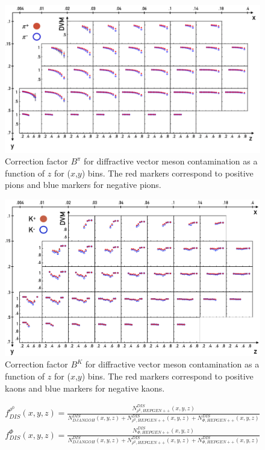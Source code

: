 \begin{figure}
	\includegraphics[scale=0.5]{./gfx/DVMpi.png}
	\caption{Correction factor $B^{\pi}$ for diffractive vector meson contamination as a function of $z$ for ($x$,$y$) bins. The red markers correspond to positive pions and blue markers for negative pions.}
	\label{DVMpi}
\end{figure}

\begin{figure}
	\includegraphics[scale=0.5]{./gfx/DVMK.png}
	\caption{Correction factor $B^{K}$ for diffractive vector meson contamination as a function of $z$ for ($x$,$y$) bins. The red markers correspond to positive kaons and blue markers for negative kaons.}
	\label{DVMK}
\end{figure}

\begin{equation}
  \begin{split}
    f^{\rho^0}_{DIS}(x,y,z) = \frac{N^{DIS}_{\rho^0,HEPGEN++}(x,y,z)}{N^{DIS}_{DJANGOH}(x,y,z)+N^{DIS}_{\rho^0,HEPGEN++}(x,y,z)+N^{DIS}_{\Phi,HEPGEN++}(x,y,z)} \\
    f^{\Phi}_{DIS}(x,y,z) = \frac{N^{DIS}_{\Phi,HEPGEN++}(x,y,z)}{N^{DIS}_{DJANGOH}(x,y,z)+N^{DIS}_{\rho^0,HEPGEN++}(x,y,z)+N^{DIS}_{\Phi,HEPGEN++}(x,y,z)}
  \end{split}
\end{equation}

